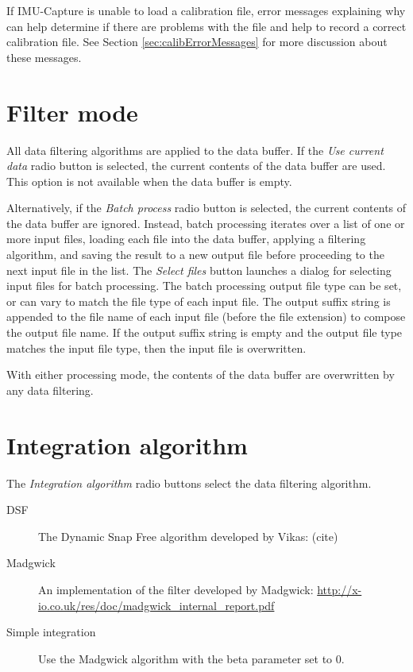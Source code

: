 \documentclass[11pt,letterpaper,article,oneside]{memoir}
\newcommand{\name}{IMU-Capture}
\begin{document}
If \name{} is unable to load a calibration file, error messages explaining why
can help determine if there are problems with the file and help to record a
correct calibration file. See Section \ref{sec:calibErrorMessages} for more
discussion about these messages.


\section{Filter mode}
All data filtering algorithms are applied to the data buffer. If the \emph{Use
current data} radio button is selected, the current contents of the data buffer
are used. This option is not available when the data buffer is empty.

Alternatively, if the \emph{Batch process} radio button is selected, the current
contents of the data buffer are ignored. Instead, batch processing iterates over
a list of one or more input files, loading each file into the data buffer,
applying a filtering algorithm, and saving the result to a new output file
before proceeding to the next input file in the list. The \emph{Select files}
button launches a dialog for selecting input files for batch processing.  The
batch processing output file type can be set, or can vary to match the file type
of each input file. The output suffix string is appended to the file name of each
input file (before the file extension) to compose the output file name. If the
output suffix string is empty and the output file type matches the input
file type, then the input file is overwritten.

With either processing mode, the contents of the data buffer are overwritten by
any data filtering.

\section{Integration algorithm}

The \emph{Integration algorithm} radio buttons select the data filtering
algorithm.

\begin{description}

\item[DSF]
The Dynamic Snap Free algorithm developed by Vikas: (cite)
\item[Madgwick] \hfill
An implementation of the filter developed by Madgwick: 
\url{http://x-io.co.uk/res/doc/madgwick_internal_report.pdf}
\item[Simple integration] \hfill
Use the Madgwick algorithm with the beta parameter set to 0.

\end{description}
\end{document}
